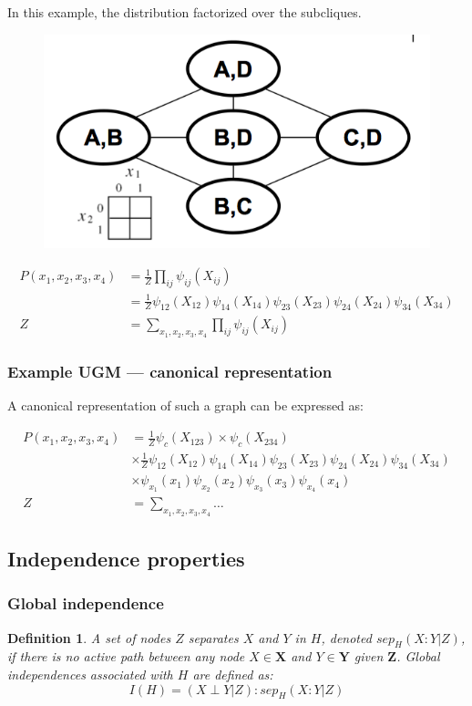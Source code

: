 \documentclass[twoside]{article}
\newtheorem{Defn}{Definition}[section]
\begin{document}
In this example, the distribution factorized over the subcliques.

\begin{figure}[!h]
	\centering
    \includegraphics[width=.4\linewidth]{assets/ugm_sub_clique.png}
\end{figure}

\[
\begin{split}
P(x_1,x_2,x_3,x_4) & = \frac{1}{Z}\prod_{ij}\psi_{ij}(X_{ij}) \\
& = \frac{1}{Z}\psi_{12}(X_{12})\psi_{14}(X_{14})\psi_{23}(X_{23})\psi_{24}(X_{24})\psi_{34}(X_{34}) \\
Z & = \sum_{x_1,x_2,x_3,x_4}\prod_{ij}\psi_{ij}(X_{ij})
\end{split}
\]

\subsubsection{Example UGM --- canonical representation}

A canonical representation of such a graph can be expressed as:

\[
\begin{split}
P(x_1,x_2,x_3,x_4) & = \frac{1}{Z}\psi_c(X_{123})\times \psi_c(X_{234}) \\
& \times \frac{1}{Z}\psi_{12}(X_{12})\psi_{14}(X_{14})\psi_{23}(X_{23})\psi_{24}(X_{24})\psi_{34}(X_{34}) \\
& \times \psi_{x_1}(x_1)\psi_{x_2}(x_2)\psi_{x_3}(x_3)\psi_{x_4}(x_4) \\
Z & = \sum_{x_1,x_2,x_3,x_4} \ldots
\end{split}
\]

\subsection{Independence properties}

\subsubsection{Global independence}
\begin{Defn}
A set of nodes \(Z\) separates \(X\) and \(Y\) in \(H\), denoted \(sep_H(X : Y |Z)\), if there is no active path between any node \(X \in \mathbf{X}\) and \(Y \in \mathbf{Y}\) given \(\mathbf{Z}\). Global independences associated with \(H\) are defined as:
\begin{equation}
I(H)={(X\perp Y|Z) :sep_H( X :Y|Z)}
\end{equation}
\end{Defn}
\end{document}
